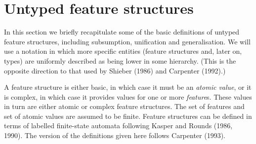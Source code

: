\documentclass[12pt]{report}
\begin{document}
\section{Untyped feature structures}
\label{extvsint}

In this section we briefly recapitulate 
some of the basic definitions of untyped feature structures, including
subsumption, unification and generalisation.  
We will use a notation in which more specific entities
(feature structures and, later on, types) are uniformly described as
being lower in some hierarchy.  (This is the opposite direction
to that used by Shieber (1986) and Carpenter (1992).)

A feature structure is either basic, in which case it must
be an {\em atomic value}, or it is complex, in which case it
provides values for one or more {\em feature}s.  
These values in turn are either atomic or complex feature structures.
The set  of features and 
set  of atomic values are assumed to be finite.
Feature structures can be defined in terms of
labelled finite-state automata
following Kasper and Rounds (1986, 1990).  The version of the
definitions given here follows Carpenter (1993).    
%
\end{document}
